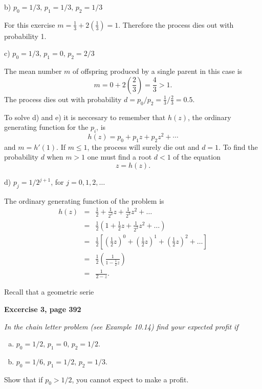 \documentclass[12pt]{article}
\begin{document}
	\noindent b) $p_0 = 1 / 3, \, p_1 = 1 / 3, \, p_2 = 1 / 3$
	
	For this exercise $m = \frac{1}{3} + 2\left(\frac{1}{3} \right) = 1$. Therefore the process dies out with probability 1.
	
	\noindent c) $p_0 = 1 / 3, \, p_1 = 0, \, p_2 = 2 / 3$
	
	The mean number $m$ of offspring produced by a single parent in this case is
	\begin{equation*}
	m = 0 + 2\left( \frac{2}{3} \right) = \frac{4}{3} > 1.
	\end{equation*}
	The process dies out with probability $d= p_0/p_2 = \frac{1}{3}/\frac{2}{3} = 0.5$.
	
	To solve d) and e) it is neccesary to remember that $h(z)$, the ordinary generating function for the $p_i$, is 
	$$h(z) = p_0 + p_1 z + p_2 z^2 + \cdots $$
	and $m=h'(1)$. If $m\leq 1$, the process will surely die out and $d = 1$. To find the
	probability $d$ when $m > 1$ one must find a root $d < 1$ of the equation
	\begin{equation*}
	z = h(z).
	\end{equation*}
	
	\noindent d) $p_j = 1 / 2^{j + 1}$, for $j = 0, 1, 2, \ldots$
	
	The ordinary generating function of the problem is 
	\begin{eqnarray*}
	h(z) &=& \frac{1}{2} + \frac{1}{2^2}z + \frac{1}{2^3}z^2 + \ldots \\
	&=& \frac{1}{2} \left( 1 + \frac{1}{2} z + \frac{1}{2^2}z^2 + \ldots \right) \\
	&=& \frac{1}{2} \left[ \left(\frac{1}{2}z\right)^0 + \left(\frac{1}{2}z\right)^1 + \left(\frac{1}{2}z\right)^2 + \ldots \right] \\
	&=& \frac{1}{2} \left(\frac{1}{1 - \frac{1}{2} z}\right)\\
	&=& \frac{1}{2 - z}.
	\end{eqnarray*}

	Recall that a geometric serie 
	
	{\bf Excercise 3, page 392}
	
	{\em In the chain letter problem (see Example 10.14) find your expected profit if {\setlength{\parskip}{0cm}
			\begin{enumerate}[a)]
				\item $p_0 = 1/2, \, p_1 = 0, \, p_2 = 1/2$.
				\item $p_0 = 1/6, \, p_1 = 1/2, \, p_2 = 1/3$.
			\end{enumerate}
			Show that if $p_0 > 1 / 2$, you cannot expect to make a profit.}
	}
	
\end{document}
